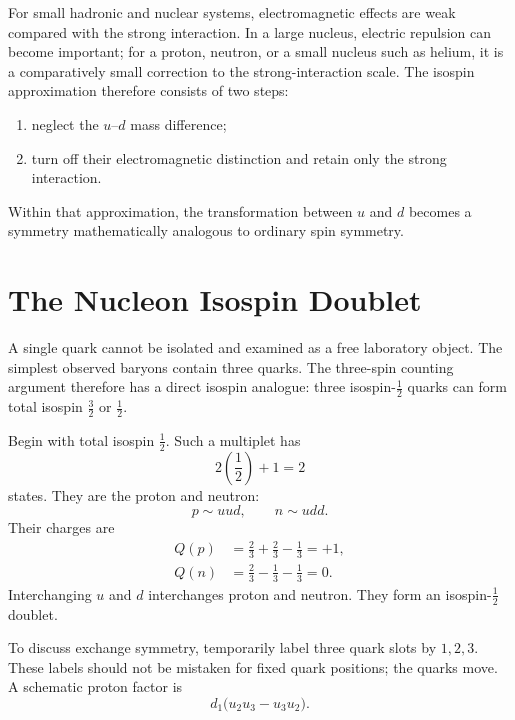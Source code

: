 For small hadronic and nuclear systems, electromagnetic effects are weak compared with the strong interaction. In a large nucleus, electric repulsion can become important; for a proton, neutron, or a small nucleus such as helium, it is a comparatively small correction to the strong-interaction scale. The isospin approximation therefore consists of two steps:

\begin{enumerate}
\item neglect the \(u\)--\(d\) mass difference;
\item turn off their electromagnetic distinction and retain only the strong interaction.
\end{enumerate}

Within that approximation, the transformation between \(u\) and \(d\) becomes a symmetry mathematically analogous to ordinary spin symmetry.

\section{The Nucleon Isospin Doublet}

A single quark cannot be isolated and examined as a free laboratory object. The simplest observed baryons contain three quarks. The three-spin counting argument therefore has a direct isospin analogue: three isospin-\(\tfrac12\) quarks can form total isospin \(\tfrac32\) or \(\tfrac12\).

Begin with total isospin \(\tfrac12\). Such a multiplet has
\begin{equation}
2\left(\frac12\right)+1=2
\end{equation}
states. They are the proton and neutron:
\begin{equation}
p\sim uud,
\qquad
n\sim udd.
\end{equation}
Their charges are
\begin{align}
Q(p)
&=\frac23+\frac23-\frac13
=+1,\\
Q(n)
&=\frac23-\frac13-\frac13
=0.
\end{align}
Interchanging \(u\) and \(d\) interchanges proton and neutron. They form an isospin-\(\tfrac12\) doublet.

To discuss exchange symmetry, temporarily label three quark slots by \(1,2,3\). These labels should not be mistaken for fixed quark positions; the quarks move. A schematic proton factor is
\begin{equation}
d_1\bigl(u_2u_3-u_3u_2\bigr).
\end{equation}

